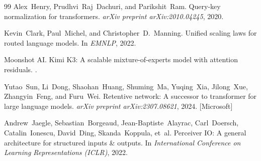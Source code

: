 \documentclass[11pt,a4paper]{article}
\begin{document}
\begin{thebibliography}{99}
Alex~Henry, Prudhvi~Raj~Dachuri, and Parikshit~Ram.
\newblock Query-key normalization for transformers.
\newblock \emph{arXiv preprint arXiv:2010.04245}, 2020.

Kevin~Clark, Paul~Michel, and Christopher~D.~Manning.
\newblock Unified scaling laws for routed language models.
\newblock In \emph{EMNLP}, 2022.

Moonshot AI.
\newblock Kimi K3: A scalable mixture-of-experts model with attention residuals.
.

Yutao~Sun, Li~Dong, Shaohan~Huang, Shuming~Ma, Yuqing~Xia, Jilong~Xue, Zhangyin~Feng, and Furu~Wei.
\newblock Retentive network: A successor to transformer for large language models.
\newblock \emph{arXiv preprint arXiv:2307.08621}, 2024. [Microsoft]

Andrew~Jaegle, Sebastian~Borgeaud, Jean-Baptiste~Alayrac, Carl~Doersch, Catalin~Ionescu, David~Ding, Skanda~Koppula, et~al.
\newblock Perceiver IO: A general architecture for structured inputs \& outputs.
\newblock In \emph{International Conference on Learning Representations (ICLR)}, 2022.

\end{thebibliography}
\end{document}
